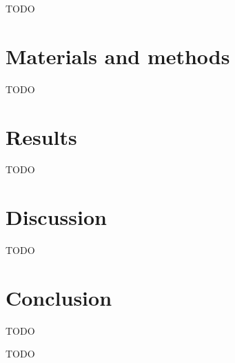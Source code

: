 \documentclass[12pt,a4paper]{article}
\begin{document}
TODO

\section{Materials and methods}

TODO

\section{Results}

TODO

\section{Discussion}

TODO

\section{Conclusion}

TODO
\newpage




\newpage

\appendix
\setcounter{figure}{0}

TODO
\end{document}
